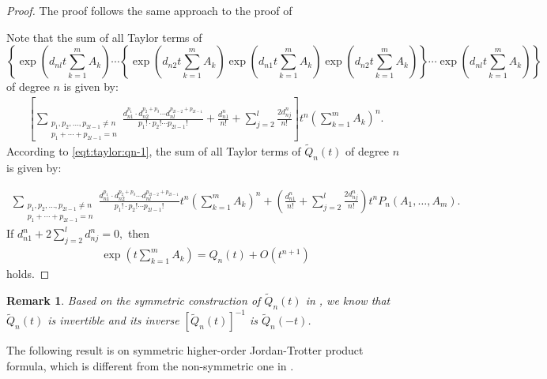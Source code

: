 \documentclass{article}
\theoremstyle{plain} %
\newtheorem{rmk}[thm]{Remark}
\numberwithin{equation}{section}
\begin{document}
\begin{proof}
The proof follows the same approach to the proof of %


Note that the sum of all Taylor terms of %
\[ \left\{\exp\left(d_{nl} t\sum_{k=1}^m A_k\right)\cdots\left\{\exp\left(d_{n2} t\sum_{k=1}^m A_k\right)\exp\left(d_{n1} t\sum_{k=1}^m A_k\right)\exp\left(d_{n2} t\sum_{k=1}^m A_k\right)\right\}\cdots \exp\left(d_{nl} t\sum_{k=1}^m A_k\right)\right\}\] of degree $n$ is given by:
\begin{align*}
\left[ \sum_{\substack{p_1, p_2, \dots, p_{2l-1}\neq n \\ p_1 + \cdots + p_{2l-1} = n}} \frac{d_{n1}^{p_1} \cdot d_{n2}^{p_2+p_3}\cdots d_{nl}^{p_{2l-2}+p_{2l-1}}}{p_1! \cdot p_2!\cdots p_{2l-1}!}+\frac{d_{n1}^n}{n!}+\sum_{j=2}^l \frac{2d_{nj}^n}{n!} \right] t^n \left(\sum_{k=1}^m A_k\right)^n .
\end{align*}
According to \cref{eqt:taylor:qn-1}, the sum of all Taylor terms of $\displaystyle \widetilde{Q}_n(t)$ of degree $n$ is given by:

\begin{align*}
 \sum_{\substack{p_1, p_2, \dots, p_{2l-1} \neq n \\ p_1 + \cdots + p_{2l-1} = n}} \frac{d_{n1}^{p_1} \cdot d_{n2}^{p_2+p_3}\cdots d_{nl}^{p_{2l-2}+p_{2l-1}}}{p_1! \cdot p_2!\cdots p_{2l-1}!} t^n \left(\sum_{k=1}^m A_k\right)^n +\left(\frac{d_{n1}^n}{n!}+\sum_{j=2}^l \frac{2d_{nj}^n}{n!}\right)t^n P_n(A_1,\dots, A_m).
\end{align*}
If $\displaystyle d_{n1}^n+2\sum_{j=2}^l d_{nj}^n=0,$ then \begin{align*}
    \exp\left(t\sum_{k=1}^m A_k\right) = Q_n(t) + O(t^{n+1})
\end{align*}
holds.
\end{proof}
\begin{rmk}\label{rmk:inverterbility:symmetric}
Based on the symmetric construction of $\widetilde{Q}_n(t)$ in {\rm {}}, we know that $\widetilde{Q}_n(t)$ is invertible and its inverse $\displaystyle [\widetilde{Q}_n(t)]^{-1}$ is $\widetilde{Q}_n(-t)$. 
\end{rmk}
\fi 

The following result is on symmetric higher-order Jordan-Trotter product formula, which is different from the non-symmetric one in .
\end{document}

